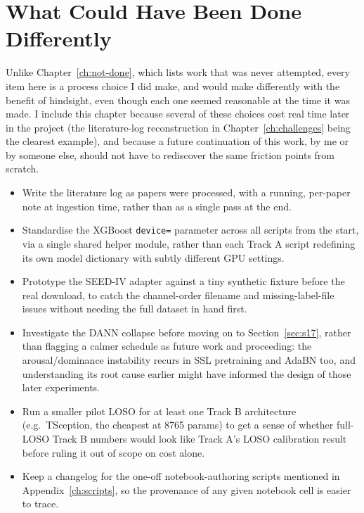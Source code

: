\documentclass[11pt]{report}
\begin{document}
\chapter{What Could Have Been Done Differently}
\label{ch:could-have}

Unlike Chapter~\ref{ch:not-done}, which lists work that was never attempted,
every item here is a process choice I did make, and would make differently
with the benefit of hindsight, even though each one seemed reasonable at the
time it was made. I include this chapter because several of these choices
cost real time later in the project (the literature-log reconstruction in
Chapter~\ref{ch:challenges} being the clearest example), and because a
future continuation of this work, by me or by someone else, should not have
to rediscover the same friction points from scratch.

\begin{itemize}
  \item Write the literature log as papers were processed, with a running,
        per-paper note at ingestion time, rather than as a single pass at
        the end.
  \item Standardise the XGBoost \texttt{device=} parameter across all
        scripts from the start, via a single shared helper module, rather
        than each Track A script redefining its own model dictionary with
        subtly different GPU settings.
  \item Prototype the SEED-IV adapter against a tiny synthetic fixture
        before the real download, to catch the channel-order filename and
        missing-label-file issues without needing the full dataset in hand
        first.
  \item Investigate the DANN collapse before moving on to Section~\ref{sec:s17},
        rather than flagging a calmer schedule as future work and
        proceeding: the arousal/dominance instability recurs in SSL
        pretraining and AdaBN too, and understanding its root cause earlier
        might have informed the design of those later experiments.
  \item Run a smaller pilot LOSO for at least one Track B architecture
        (e.g.\ TSception, the cheapest at 8765 params) to get a sense of
        whether full-LOSO Track B numbers would look like Track A's LOSO
        calibration result before ruling it out of scope on cost alone.
  \item Keep a changelog for the one-off notebook-authoring scripts
        mentioned in Appendix~\ref{ch:scripts}, so the provenance of any
        given notebook cell is easier to trace.
\end{itemize}
\end{document}
